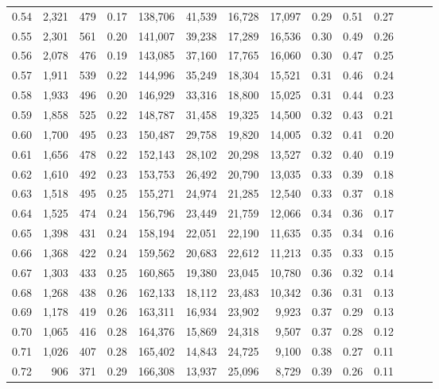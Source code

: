 \begin{tabular}{rrrrrrrrrrrrrr}
0.54 &  2,321 &    479 &  0.17 &  138,706 &   41,539 &  16,728 &  17,097 &  0.29 &  0.51 &      0.27 \\
0.55 &  2,301 &    561 &  0.20 &  141,007 &   39,238 &  17,289 &  16,536 &  0.30 &  0.49 &      0.26 \\
0.56 &  2,078 &    476 &  0.19 &  143,085 &   37,160 &  17,765 &  16,060 &  0.30 &  0.47 &      0.25 \\
0.57 &  1,911 &    539 &  0.22 &  144,996 &   35,249 &  18,304 &  15,521 &  0.31 &  0.46 &      0.24 \\
0.58 &  1,933 &    496 &  0.20 &  146,929 &   33,316 &  18,800 &  15,025 &  0.31 &  0.44 &      0.23 \\
0.59 &  1,858 &    525 &  0.22 &  148,787 &   31,458 &  19,325 &  14,500 &  0.32 &  0.43 &      0.21 \\
0.60 &  1,700 &    495 &  0.23 &  150,487 &   29,758 &  19,820 &  14,005 &  0.32 &  0.41 &      0.20 \\
0.61 &  1,656 &    478 &  0.22 &  152,143 &   28,102 &  20,298 &  13,527 &  0.32 &  0.40 &      0.19 \\
0.62 &  1,610 &    492 &  0.23 &  153,753 &   26,492 &  20,790 &  13,035 &  0.33 &  0.39 &      0.18 \\
0.63 &  1,518 &    495 &  0.25 &  155,271 &   24,974 &  21,285 &  12,540 &  0.33 &  0.37 &      0.18 \\
0.64 &  1,525 &    474 &  0.24 &  156,796 &   23,449 &  21,759 &  12,066 &  0.34 &  0.36 &      0.17 \\
0.65 &  1,398 &    431 &  0.24 &  158,194 &   22,051 &  22,190 &  11,635 &  0.35 &  0.34 &      0.16 \\
0.66 &  1,368 &    422 &  0.24 &  159,562 &   20,683 &  22,612 &  11,213 &  0.35 &  0.33 &      0.15 \\
0.67 &  1,303 &    433 &  0.25 &  160,865 &   19,380 &  23,045 &  10,780 &  0.36 &  0.32 &      0.14 \\
0.68 &  1,268 &    438 &  0.26 &  162,133 &   18,112 &  23,483 &  10,342 &  0.36 &  0.31 &      0.13 \\
0.69 &  1,178 &    419 &  0.26 &  163,311 &   16,934 &  23,902 &   9,923 &  0.37 &  0.29 &      0.13 \\
0.70 &  1,065 &    416 &  0.28 &  164,376 &   15,869 &  24,318 &   9,507 &  0.37 &  0.28 &      0.12 \\
0.71 &  1,026 &    407 &  0.28 &  165,402 &   14,843 &  24,725 &   9,100 &  0.38 &  0.27 &      0.11 \\
0.72 &    906 &    371 &  0.29 &  166,308 &   13,937 &  25,096 &   8,729 &  0.39 &  0.26 &      0.11 \\

\end{tabular}
